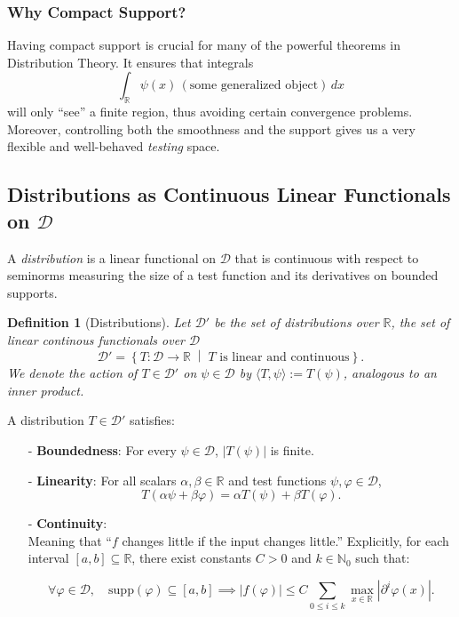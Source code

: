 \documentclass[11pt,openany]{book}
\newtheorem{definition}{Definition}[section]
\begin{document}
\subsubsection{Why Compact Support?}
Having compact support is crucial for many of the powerful theorems in Distribution Theory. It ensures that integrals
\[
\int_{\mathbb{R}} \psi(x)\,(\text{some generalized object}) \,dx
\]
will only ``see'' a finite region, thus avoiding certain convergence problems. Moreover, controlling both the smoothness and the support gives us a very flexible and well-behaved \emph{testing} space.

\newpage
\subsection{Distributions as Continuous Linear Functionals on \texorpdfstring{$\mathcal{D}$}{D}}

A \emph{distribution} is a linear functional on $\mathcal{D}$ that is continuous with respect to seminorms measuring the size of a test function and its derivatives on bounded supports.

\begin{definition}[Distributions]
Let $\mathcal{D}'$ be the set of distributions over $\mathbb{R}$, the set of linear continous functionals over $\mathcal{D}$
\[
\mathcal{D}' = \left\{ T \colon \mathcal{D} \to \mathbb{R} \;\middle|\; T \text{ is linear and continuous} \right\}.
\]
We denote the action of $T \in \mathcal{D}'$ on $\psi \in \mathcal{D}$ by $\langle T, \psi \rangle := T(\psi)$, analogous to an inner product.
\end{definition}

A distribution $T \in \mathcal{D}'$ satisfies:

\begin{itemize}
    \item[-] \textbf{Boundedness}: For every $\psi \in \mathcal{D}$, $|T(\psi)|$ is finite.
    \item[-] \textbf{Linearity}: For all scalars $\alpha, \beta \in \mathbb{R}$ and test functions $\psi, \varphi \in \mathcal{D}$,
    \[
    T(\alpha \psi + \beta \varphi) = \alpha T(\psi) + \beta T(\varphi).
    \]
    \item[-] \textbf{Continuity}: \\Meaning that ``$f$ changes little if the input changes little.'' Explicitly, for each interval $[a, b] \subseteq \mathbb{R}$, there exist constants $C > 0$ and $k \in \mathbb{N}_0$ such that:

    \[
    \forall \varphi \in \mathcal{D}, \quad \text{supp}(\varphi) \subseteq [a, b] \implies \left| f(\varphi) \right| \leq C \sum_{0 \leq i \leq k} \max_{x \in \mathbb{R}} \left| \partial^i \varphi(x) \right|.
    \]

\end{itemize}
\end{document}
